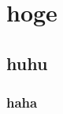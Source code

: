 \documentclass[a4paper, dvipdfmx]{jreport}	%
\begin{document}
\chapter{hoge}
\section{huhu}
\subsection{haha}
\end{document}

